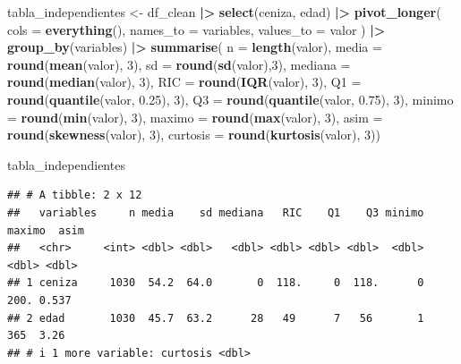 \documentclass[
]{book}
\newenvironment{Shaded}{\begin{snugshade}}{\end{snugshade}}
\newcommand{\AttributeTok}[1]{\textcolor[rgb]{0.13,0.29,0.53}{#1}}
\newcommand{\DecValTok}[1]{\textcolor[rgb]{0.00,0.00,0.81}{#1}}
\newcommand{\FloatTok}[1]{\textcolor[rgb]{0.00,0.00,0.81}{#1}}
\newcommand{\FunctionTok}[1]{\textcolor[rgb]{0.13,0.29,0.53}{\textbf{#1}}}
\newcommand{\NormalTok}[1]{#1}
\newcommand{\OtherTok}[1]{\textcolor[rgb]{0.56,0.35,0.01}{#1}}
\newcommand{\SpecialCharTok}[1]{\textcolor[rgb]{0.81,0.36,0.00}{\textbf{#1}}}
\newcommand{\StringTok}[1]{\textcolor[rgb]{0.31,0.60,0.02}{#1}}
\begin{document}
\begin{Shaded}
\begin{Highlighting}[]
\NormalTok{tabla\_independientes }\OtherTok{\textless{}{-}}\NormalTok{ df\_clean }\SpecialCharTok{|\textgreater{}} \FunctionTok{select}\NormalTok{(ceniza, edad) }\SpecialCharTok{|\textgreater{}} 
  \FunctionTok{pivot\_longer}\NormalTok{(}
    \AttributeTok{cols =} \FunctionTok{everything}\NormalTok{(),}
    \AttributeTok{names\_to =} \StringTok{\textquotesingle{}variables\textquotesingle{}}\NormalTok{,}
    \AttributeTok{values\_to =} \StringTok{\textquotesingle{}valor\textquotesingle{}}
\NormalTok{  ) }\SpecialCharTok{|\textgreater{}} 
  \FunctionTok{group\_by}\NormalTok{(variables) }\SpecialCharTok{|\textgreater{}} 
             \FunctionTok{summarise}\NormalTok{(    }
    \AttributeTok{n =} \FunctionTok{length}\NormalTok{(valor),}
    \AttributeTok{media =} \FunctionTok{round}\NormalTok{(}\FunctionTok{mean}\NormalTok{(valor), }\DecValTok{3}\NormalTok{),}
    \AttributeTok{sd =} \FunctionTok{round}\NormalTok{(}\FunctionTok{sd}\NormalTok{(valor),}\DecValTok{3}\NormalTok{),}
    \AttributeTok{mediana =} \FunctionTok{round}\NormalTok{(}\FunctionTok{median}\NormalTok{(valor), }\DecValTok{3}\NormalTok{),}
    \AttributeTok{RIC =} \FunctionTok{round}\NormalTok{(}\FunctionTok{IQR}\NormalTok{(valor), }\DecValTok{3}\NormalTok{),}
    \AttributeTok{Q1 =} \FunctionTok{round}\NormalTok{(}\FunctionTok{quantile}\NormalTok{(valor, }\FloatTok{0.25}\NormalTok{), }\DecValTok{3}\NormalTok{),}
    \AttributeTok{Q3 =} \FunctionTok{round}\NormalTok{(}\FunctionTok{quantile}\NormalTok{(valor, }\FloatTok{0.75}\NormalTok{), }\DecValTok{3}\NormalTok{),}
    \AttributeTok{minimo  =} \FunctionTok{round}\NormalTok{(}\FunctionTok{min}\NormalTok{(valor), }\DecValTok{3}\NormalTok{),}
    \AttributeTok{maximo  =} \FunctionTok{round}\NormalTok{(}\FunctionTok{max}\NormalTok{(valor), }\DecValTok{3}\NormalTok{),}
    \AttributeTok{asim    =} \FunctionTok{round}\NormalTok{(}\FunctionTok{skewness}\NormalTok{(valor), }\DecValTok{3}\NormalTok{),}
    \AttributeTok{curtosis =} \FunctionTok{round}\NormalTok{(}\FunctionTok{kurtosis}\NormalTok{(valor), }\DecValTok{3}\NormalTok{))}

\NormalTok{tabla\_independientes}
\end{Highlighting}
\end{Shaded}

\begin{verbatim}
## # A tibble: 2 x 12
##   variables     n media    sd mediana   RIC    Q1    Q3 minimo maximo  asim
##   <chr>     <int> <dbl> <dbl>   <dbl> <dbl> <dbl> <dbl>  <dbl>  <dbl> <dbl>
## 1 ceniza     1030  54.2  64.0       0  118.     0  118.      0   200. 0.537
## 2 edad       1030  45.7  63.2      28   49      7   56       1   365  3.26 
## # i 1 more variable: curtosis <dbl>
\end{verbatim}
\end{document}
